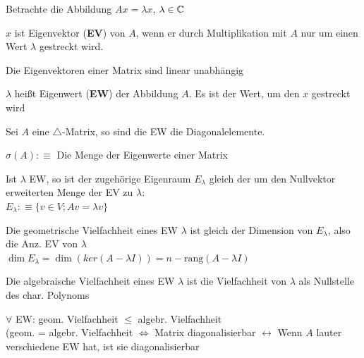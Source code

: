 \documentclass[a4paper,twocolumn]{article}
\begin{document}
	Betrachte die Abbildung $Ax = \lambda x$, $\lambda \in \mathbb{C}$
	
	\begin{fdef}[Eigenvektoren]
		$x$ ist Eigenvektor (\textbf{EV}) von $A$, wenn er durch Multiplikation mit $A$ nur um einen Wert $\lambda$ gestreckt wird.
	\end{fdef}
		\vspace{-3mm}
		Die Eigenvektoren einer Matrix sind linear unabhängig
		
	\begin{fdef}[Eigenwerte]
		$\lambda$ heißt Eigenwert (\textbf{EW}) der Abbildung $A$. Es ist der Wert, um den $x$ gestreckt wird
	\end{fdef}
	
	\begin{fmerke}
		Sei $A$ eine $\triangle$-Matrix, so sind die EW die Diagonalelemente.
	\end{fmerke}

	\begin{fdef}[Spektrum]
		$\sigma(A) :\equiv$ Die Menge der Eigenwerte einer Matrix
	\end{fdef}

	\begin{fdef}[Eigenraum (ER)]
		Ist $\lambda$ EW, so ist der zugehörige Eigenraum $E_\lambda$ gleich der um den Nullvektor erweiterten
		Menge der EV zu $\lambda$:\\
		$E_\lambda :\equiv \{v \in V; Av = \lambda v\}$
	\end{fdef}
	
	\begin{fdef}
		Die geometrische Vielfachheit eines EW $\lambda$ ist gleich der Dimension von $E_\lambda$, also die Anz. EV von $\lambda$\\[1mm]
		$\dim E_\lambda = \dim(ker(A-\lambda I)) = n - \text{rang}(A - \lambda I)$
	\end{fdef}
	
	\begin{fdef}
		Die algebraische Vielfachheit eines EW $\lambda$ ist die Vielfachheit von $\lambda$ als Nullstelle des char. Polynoms
	\end{fdef}
	$\forall$ EW: geom. Vielfachheit $\le$ algebr. Vielfachheit\\
	(geom. = algebr. Vielfachheit $\Leftrightarrow$ Matrix diagonalisierbar
	$\leftrightarrow$ Wenn $A$ lauter verschiedene EW hat, ist sie diagonalisierbar
	
\end{document}
